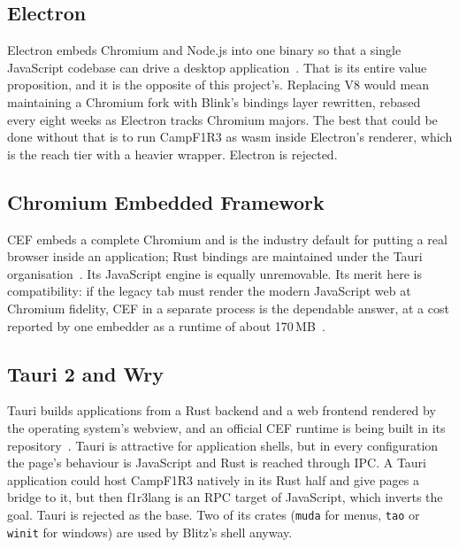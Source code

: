\documentclass[11pt]{article}
\theoremstyle{definition}
\theoremstyle{remark}
\newcommand{\fl}{f1r3lang}
\newcommand{\Camp}{CampF1R3}
\newcommand{\code}[1]{\texttt{#1}}
\begin{document}
\subsection{Electron}
Electron embeds Chromium and Node.js into one binary so that a single JavaScript
codebase can drive a desktop application~\cite{electron}. That is its entire value
proposition, and it is the opposite of this project's. Replacing V8 would mean
maintaining a Chromium fork with Blink's bindings layer rewritten, rebased every
eight weeks as Electron tracks Chromium majors. The best that could be done without
that is to run \Camp{} as wasm inside Electron's renderer, which is the reach tier
with a heavier wrapper. Electron is rejected.

\subsection{Chromium Embedded Framework}
CEF embeds a complete Chromium and is the industry default for putting a real
browser inside an application; Rust bindings are maintained under the Tauri
organisation~\cite{cef}. Its JavaScript engine is equally unremovable. Its merit
here is compatibility: if the legacy tab must render the modern JavaScript web at
Chromium fidelity, CEF in a separate process is the dependable answer, at a cost
reported by one embedder as a runtime of about 170\,MB~\cite{atrium}.

\subsection{Tauri 2 and Wry}
Tauri builds applications from a Rust backend and a web frontend rendered by the
operating system's webview, and an official CEF runtime is being built in its
repository~\cite{tauricef}. Tauri is attractive for application shells, but in every
configuration the page's behaviour is JavaScript and Rust is reached through IPC. A
Tauri application could host \Camp{} natively in its Rust half and give pages a
bridge to it, but then \fl{} is an RPC target of JavaScript, which inverts the goal.
Tauri is rejected as the base. Two of its crates (\code{muda} for menus,
\code{tao} or \code{winit} for windows) are used by Blitz's shell anyway.
\end{document}
